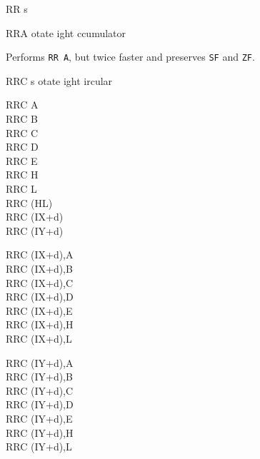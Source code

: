 \begin{basedescript}{
	\desclabelstyle{\multilinelabel}
	\desclabelwidth{3cm}}
\begin{DetailItem}{RR s}
		\begin{DetailEffects}[p]
			\FlagsRRr
		\end{DetailEffects}
						
		\begin{DetailTiming}
		\end{DetailTiming}

	\end{DetailItem}

	\begin{DetailItem}{RRA}
		{otate ight ccumulator}
		{\SymRR{A}}

		Performs {\tt RR A}, but twice faster and preserves {\tt SF} and {\tt ZF}.

		\begin{DetailEffects}
			\FlagsRRA
		\end{DetailEffects}
						
		\begin{DetailTiming}
			\DetailTime{1}{4}
		\end{DetailTiming}

	\end{DetailItem}

	\pagebreak
	\begin{DetailItem}{RRC s}
		{otate ight ircular}
		{\SymRRC{s}}

		\begin{DetailVariants}
			RRC A\\
			RRC B\\
			RRC C\\
			RRC D\\
			RRC E\\
			RRC H\\
			RRC L\\
			RRC (HL)\\
			RRC (IX+d)\\
			RRC (IY+d)

			\columnbreak
			RRC (IX+d),A\UNDOC\\
			RRC (IX+d),B\UNDOC\\
			RRC (IX+d),C\UNDOC\\
			RRC (IX+d),D\UNDOC\\
			RRC (IX+d),E\UNDOC\\
			RRC (IX+d),H\UNDOC\\
			RRC (IX+d),L\UNDOC

			\columnbreak
			RRC (IY+d),A\UNDOC\\
			RRC (IY+d),B\UNDOC\\
			RRC (IY+d),C\UNDOC\\
			RRC (IY+d),D\UNDOC\\
			RRC (IY+d),E\UNDOC\\
			RRC (IY+d),H\UNDOC\\
			RRC (IY+d),L\UNDOC
		\end{DetailVariants}


\end{DetailItem}
\end{basedescript}
